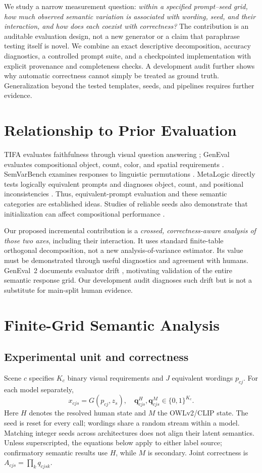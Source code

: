 \documentclass[10pt,letterpaper]{article}
\newcommand{\q}{\boldsymbol{q}}
\begin{document}
We study a narrow measurement question: \emph{within a specified prompt--seed grid, how much observed semantic variation is associated with wording, seed, and their interaction, and how does each coexist with correctness?} The contribution is an auditable evaluation design, not a new generator or a claim that paraphrase testing itself is novel. We combine an exact descriptive decomposition, accuracy diagnostics, a controlled prompt suite, and a checkpointed implementation with explicit provenance and completeness checks. A development audit further shows why automatic correctness cannot simply be treated as ground truth. Generalization beyond the tested templates, seeds, and pipelines requires further evidence.

\section{Relationship to Prior Evaluation}
TIFA evaluates faithfulness through visual question answering \cite{tifa}; GenEval evaluates compositional object, count, color, and spatial requirements \cite{geneval}. SemVarBench examines responses to linguistic permutations \cite{semvar}. MetaLogic directly tests logically equivalent prompts and diagnoses object, count, and positional inconsistencies \cite{metalogic}. Thus, equivalent-prompt evaluation and these semantic categories are established ideas. Studies of reliable seeds also demonstrate that initialization can affect compositional performance \cite{seeds}.

Our proposed incremental contribution is a \emph{crossed, correctness-aware analysis of those two axes}, including their interaction. It uses standard finite-table orthogonal decomposition, not a new analysis-of-variance estimator. Its value must be demonstrated through useful diagnostics and agreement with humans. GenEval~2 documents evaluator drift \cite{geneval2}, motivating validation of the entire semantic response grid. Our development audit diagnoses such drift but is not a substitute for main-split human evidence.

\section{Finite-Grid Semantic Analysis}
\subsection{Experimental unit and correctness}
Scene $c$ specifies $K_c$ binary visual requirements and $J$ equivalent wordings $p_{cj}$. For each model separately,
\begin{equation}
 x_{cjs}=G(p_{cj},z_s),\quad \q^{H}_{cjs},\q^{M}_{cjs}\in\{0,1\}^{K_c}.
\end{equation}
Here $H$ denotes the resolved human state and $M$ the OWLv2/CLIP state. The seed is reset for every call; wordings share a random stream within a model. Matching integer seeds across architectures does not align their latent semantics. Unless superscripted, the equations below apply to either label source; confirmatory semantic results use $H$, while $M$ is secondary. Joint correctness is $A_{cjs}=\prod_k q_{cjsk}$.
\end{document}
